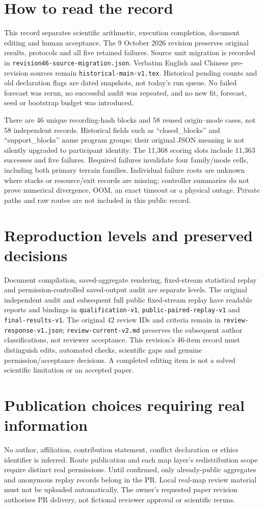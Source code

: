 \section{How to read the record}
This record separates scientific arithmetic, execution completion, document
editing and human acceptance. The 9 October 2026 revision preserves original
results, protocols and all five retained failures. Source unit migration is
recorded in \texttt{revision46-source-migration.json}. Verbatim English and
Chinese pre-revision sources remain \texttt{historical-main-v1.tex}.
Historical pending counts and old declaration flags are dated snapshots,
not today's run queue. No failed forecast was rerun, no successful audit was
repeated, and no new fit, forecast, seed or bootstrap budget was introduced.

There are 46 unique recording-hash blocks and 58 reused origin--mode cases,
not 58 independent records. Historical fields such as ``closed\_blocks'' and
``support\_blocks'' name program groups; their original JSON meaning is not
silently upgraded to participant identity. The 11,368 scoring slots include
11,363 successes and five failures. Required failures invalidate four
family/mode cells, including both primary terrain families.
Individual failure roots are unknown where stacks or resource/exit records
are missing; controller summaries do not prove numerical divergence, OOM,
an exact timeout or a physical outage. Private paths and raw routes are not
included in this public record.

\section{Reproduction levels and preserved decisions}
Document compilation, saved-aggregate rendering, fixed-stream statistical
replay and permission-controlled saved-output audit are separate levels.
The original independent audit and subsequent full public fixed-stream
replay have readable reports and bindings in \texttt{qualification-v1},
\texttt{public-paired-replay-v1} and \texttt{final-results-v1}.
The original 42 review IDs and criteria remain in
\texttt{review-response-v1.json}; \texttt{review-current-v2.md} preserves
the subsequent author classifications, not reviewer acceptance.
This revision's 46-item record must distinguish edits, automated checks,
scientific gaps and genuine permission/acceptance decisions. A completed
editing item is not a solved scientific limitation or an accepted paper.

\section{Publication choices requiring real information}
No author, affiliation, contribution statement, conflict declaration or
ethics identifier is inferred. Route publication and each map layer's
redistribution scope require distinct real permissions. Until confirmed,
only already-public aggregates and anonymous replay records belong in the
PR. Local real-map review material must not be uploaded automatically.
The owner's requested paper revision authorises PR delivery, not fictional
reviewer approval or scientific reruns.

